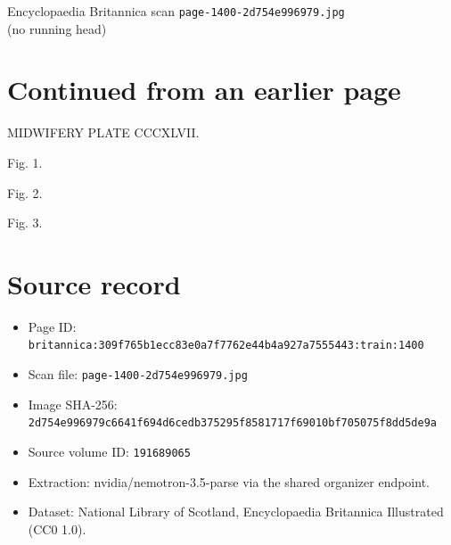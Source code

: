 \documentclass{article}
\begin{document}
\begin{center}
{\Large Encyclopaedia Britannica scan \texttt{page-1400-2d754e996979.jpg}}\\[0.5em]
(no running head)
\end{center}
\section*{Continued from an earlier page}
MIDWIFERY PLATE CCCXLVII.

Fig. 1.

Fig. 2.

Fig. 3.

\section*{Source record}
\begin{itemize}
\item Page ID: \texttt{britannica:309f765b1ecc83e0a7f7762e44b4a927a7555443:train:1400}
\item Scan file: \texttt{page-1400-2d754e996979.jpg}
\item Image SHA-256: \texttt{2d754e996979c6641f694d6cedb375295f8581717f69010bf705075f8dd5de9a}
\item Source volume ID: \texttt{191689065}
\item Extraction: nvidia/nemotron-3.5-parse via the shared organizer endpoint.
\item Dataset: National Library of Scotland, Encyclopaedia Britannica Illustrated (CC0 1.0).
\end{itemize}
\end{document}
